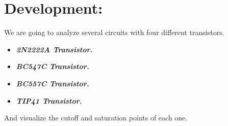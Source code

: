 \section{Development:}

We are going to analyze several circuits with four different transistors. 

\begin{itemize}
\item {\bfseries\itshape 2N2222A Transistor.}
\item {\bfseries\itshape BC547C Transistor.}
\item {\bfseries\itshape BC557C Transistor.}
\item {\bfseries\itshape TIP41 Transistor.}
\end{itemize}

And visualize the cutoff and saturation points of each one.

